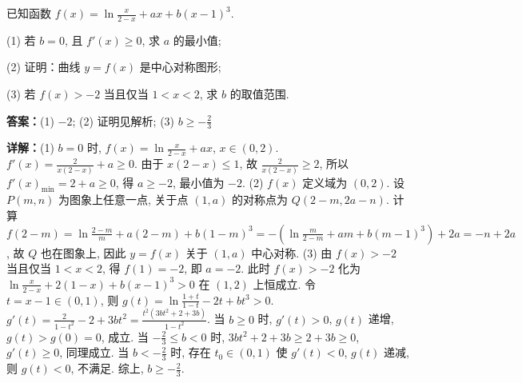 \begin{question}[points=17]
已知函数 $f(x) = \ln\frac{x}{2-x} + ax + b(x-1)^3$.

(1) 若 $b=0$, 且 $f'(x) \ge 0$, 求 $a$ 的最小值;

(2) 证明：曲线 $y = f(x)$ 是中心对称图形;

(3) 若 $f(x) > -2$ 当且仅当 $1 < x < 2$, 求 $b$ 的取值范围.
\begin{solution}
\textbf{答案：}(1) $-2$; (2) 证明见解析; (3) $b \ge -\frac{2}{3}$

\textbf{详解：}(1) $b=0$ 时, $f(x) = \ln\frac{x}{2-x} + ax$, $x\in(0,2)$. $f'(x) = \frac{2}{x(2-x)} + a \ge 0$. 由于 $x(2-x) \le 1$, 故 $\frac{2}{x(2-x)} \ge 2$, 所以 $f'(x)_{\min} = 2 + a \ge 0$, 得 $a \ge -2$, 最小值为 $-2$.
(2) $f(x)$ 定义域为 $(0,2)$. 设 $P(m,n)$ 为图象上任意一点, 关于点 $(1,a)$ 的对称点为 $Q(2-m, 2a-n)$. 计算 $f(2-m) = \ln\frac{2-m}{m} + a(2-m) + b(1-m)^3 = -\left(\ln\frac{m}{2-m} + am + b(m-1)^3\right) + 2a = -n+2a$, 故 $Q$ 也在图象上, 因此 $y=f(x)$ 关于 $(1,a)$ 中心对称.
(3) 由 $f(x) > -2$ 当且仅当 $1 < x < 2$, 得 $f(1) = -2$, 即 $a = -2$. 此时 $f(x) > -2$ 化为 $\ln\frac{x}{2-x} + 2(1-x) + b(x-1)^3 > 0$ 在 $(1,2)$ 上恒成立. 令 $t=x-1\in(0,1)$, 则 $g(t) = \ln\frac{1+t}{1-t} - 2t + bt^3 > 0$. $g'(t) = \frac{2}{1-t^2} - 2 + 3bt^2 = \frac{t^2(3b t^2 + 2 + 3b)}{1-t^2}$.
当 $b \ge 0$ 时, $g'(t) > 0$, $g(t)$ 递增, $g(t) > g(0)=0$, 成立.
当 $-\frac{2}{3} \le b < 0$ 时, $3b t^2 + 2 + 3b \ge 2+3b \ge 0$, $g'(t) \ge 0$, 同理成立.
当 $b < -\frac{2}{3}$ 时, 存在 $t_0 \in (0,1)$ 使 $g'(t) < 0$, $g(t)$ 递减, 则 $g(t) < 0$, 不满足.
综上, $b \ge -\frac{2}{3}$.
\end{solution}
\end{question}

